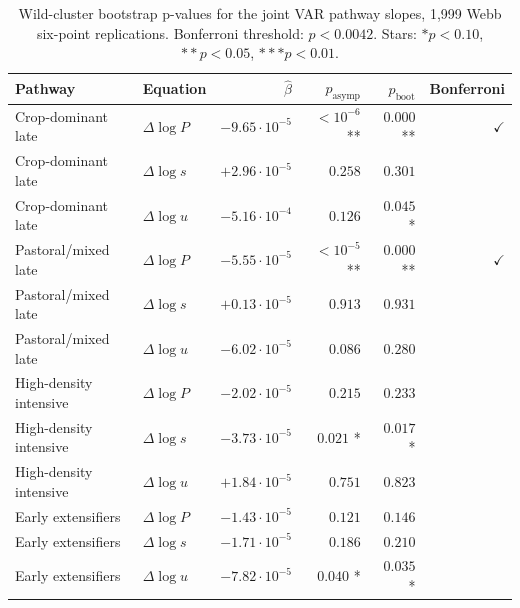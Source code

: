 \documentclass[11pt,letterpaper]{article}
\begin{document}
\begin{table}[H]
\centering
\caption{Wild-cluster bootstrap p-values for the joint VAR pathway slopes, 1{,}999 Webb six-point replications. Bonferroni threshold: $p<0.0042$. Stars: $* p<0.10$, $** p<0.05$, $*** p<0.01$.}
\label{tab:joint-var-bootstrap}
\small
\begin{tabular}{llrrrr}
\toprule
Pathway & Equation & $\hat\beta$ & $p_{\text{asymp}}$ & $p_{\text{boot}}$ & Bonferroni \\
\midrule
Crop-dominant late    & $\Delta \log P$ & $-9.65\!\cdot\!10^{-5}$ & $<10^{-6}$ \quad *** & $0.000$ \quad *** & $\checkmark$ \\
Crop-dominant late    & $\Delta \log s$ & $+2.96\!\cdot\!10^{-5}$ & $0.258$               & $0.301$           &  \\
Crop-dominant late    & $\Delta \log u$ & $-5.16\!\cdot\!10^{-4}$ & $0.126$               & $0.045$ \quad **  &  \\
Pastoral/mixed late   & $\Delta \log P$ & $-5.55\!\cdot\!10^{-5}$ & $<10^{-5}$ \quad *** & $0.000$ \quad *** & $\checkmark$ \\
Pastoral/mixed late   & $\Delta \log s$ & $+0.13\!\cdot\!10^{-5}$ & $0.913$               & $0.931$           &  \\
Pastoral/mixed late   & $\Delta \log u$ & $-6.02\!\cdot\!10^{-5}$ & $0.086$ \quad *      & $0.280$           &  \\
High-density intensive & $\Delta \log P$ & $-2.02\!\cdot\!10^{-5}$ & $0.215$              & $0.233$           &  \\
High-density intensive & $\Delta \log s$ & $-3.73\!\cdot\!10^{-5}$ & $0.021$ \quad **    & $0.017$ \quad **  &  \\
High-density intensive & $\Delta \log u$ & $+1.84\!\cdot\!10^{-5}$ & $0.751$              & $0.823$           &  \\
Early extensifiers    & $\Delta \log P$ & $-1.43\!\cdot\!10^{-5}$ & $0.121$               & $0.146$           &  \\
Early extensifiers    & $\Delta \log s$ & $-1.71\!\cdot\!10^{-5}$ & $0.186$               & $0.210$           &  \\
Early extensifiers    & $\Delta \log u$ & $-7.82\!\cdot\!10^{-5}$ & $0.040$ \quad **    & $0.035$ \quad **  &  \\
\bottomrule
\end{tabular}
\end{table}
\end{document}
